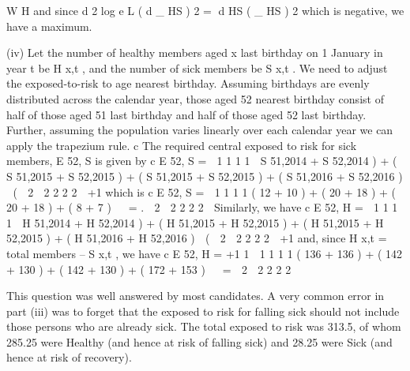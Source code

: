 \documentclass[a4paper,12pt]{article}
\begin{document}
W H
and since
d 2 log e L
( d \mu_ HS ) 2
\;=\;
d HS
( \mu_ HS ) 2
which is negative, we have a maximum.



(iv)
Let the number of healthy members aged x last birthday on 1 January in
year t be H x,t , and the number of sick members be S x,t .
We need to adjust the exposed-to-risk to age nearest birthday. 
Assuming birthdays are evenly distributed across the calendar year, 
those aged 52 nearest birthday consist of half of those aged 51 last
birthday and half of those aged 52 last birthday. 
Further, assuming the population varies linearly over each calendar year
we can apply the trapezium rule. 
c
The required central exposed to risk for sick members, E 52, S is given by
c
E 52,
S \;=  1
1
1
1

S 51,2014 + S 52,2014 ) + ( S 51,2015 + S 52,2015 ) + ( S 51,2015 + S 52,2015 ) + ( S 51,2016 + S 52,2016 ) 
(

2  2
2
2
2

+1
which is
c
E 52,
S \;=  1
1
1
1
( 12 + 10 ) + ( 20 + 18 ) + ( 20 + 18 ) + ( 8 + 7 )   \;= .

2  2
2
2
2

Similarly, we have
c
E 52,
H \;=  1
1
1
1

H 51,2014 + H 52,2014 ) + ( H 51,2015 + H 52,2015 ) + ( H 51,2015 + H 52,2015 ) + ( H 51,2016 + H 52,2016 ) 
(

2  2
2
2
2

+1
and, since H x,t = total members – S x,t , we have
c
E 52,
H \;=\;
+1
1  1
1
1
1
( 136 + 136 ) + ( 142 + 130 ) + ( 142 + 130 ) + ( 172 + 153 )   \;= 

2  2
2
2
2


\newpage

This question was well answered by most candidates. A very common error in part (iii) was to forget that the exposed to risk for falling sick should not include those persons who are already sick. The total exposed to risk was 313.5, of whom 285.25 were Healthy (and hence at risk of falling sick) and 28.25 were Sick (and hence at risk of recovery).

\end{document}

